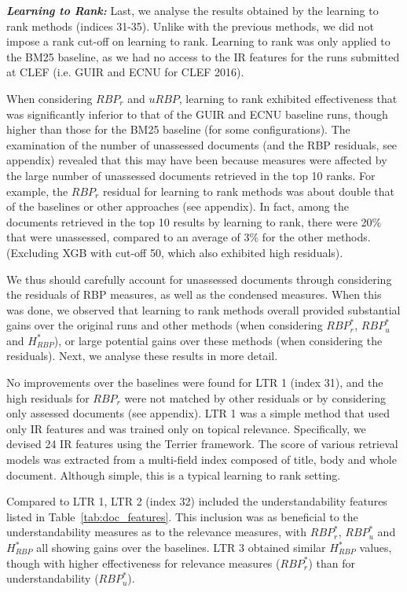 \documentclass[10pt,a4paper]{article}
\begin{document}
\textit{\textbf{Learning to Rank:}} Last, we analyse the results obtained by the learning to rank methods (indices 31-35). Unlike with the previous methods, we did not impose a rank cut-off on learning to rank. Learning to rank was only applied to the BM25 baseline, as we had no access to the IR features for the runs submitted at CLEF (i.e. GUIR and ECNU for CLEF 2016).

When considering $RBP_r$ and $uRBP$, learning to rank exhibited effectiveness that was significantly inferior to that of the GUIR and ECNU baseline runs, though higher than those for the BM25 baseline (for some configurations). The examination of the number of unassessed documents (and the RBP residuals, see appendix) revealed that this may have been because measures were affected by the large number of unassessed documents retrieved in the top 10 ranks. For example, the $RBP_r$ residual for learning to rank methods was about double that of the baselines or other approaches (see appendix). In fact, among the documents retrieved in the top 10 results by learning to rank, there were 20\% that were unassessed, compared to an average of 3\% for the other methods. (Excluding XGB with cut-off 50, which also exhibited high residuals). 

We thus should carefully account for unassessed documents through considering the residuals of RBP measures, as well as the condensed measures. When this was done, we observed that learning to rank methods overall provided substantial gains over the original runs and other methods (when considering $RBP^*_r$, $RBP^*_u$ and $H_{RBP}^*$), or large potential gains over these methods (when considering the residuals). Next, we analyse these results in more detail. 

No improvements over the baselines were found for LTR 1 (index 31), and the high residuals for $RBP_r$ were not matched by other residuals or by considering only assessed documents (see appendix). LTR 1 was a simple method that used only IR features and was trained only on topical relevance. Specifically, we devised 24 IR features using the Terrier framework. The score of various retrieval models was extracted from a multi-field index composed of title, body and whole document. Although simple, this is a typical learning to rank setting.

Compared to LTR 1, LTR 2 (index 32) included the understandability features listed in Table~\ref{tab:doc_features}. This inclusion was as beneficial to the understandability measures as to the relevance measures, with $RBP_r^*$, $RBP_u^*$ and $H_{RBP}^*$ all showing gains over the baselines. LTR 3 obtained similar $H_{RBP}^*$ values, though with higher effectiveness for relevance measures ($RBP_r^*$) than for understandability ($RBP_u^*$).
\end{document}
